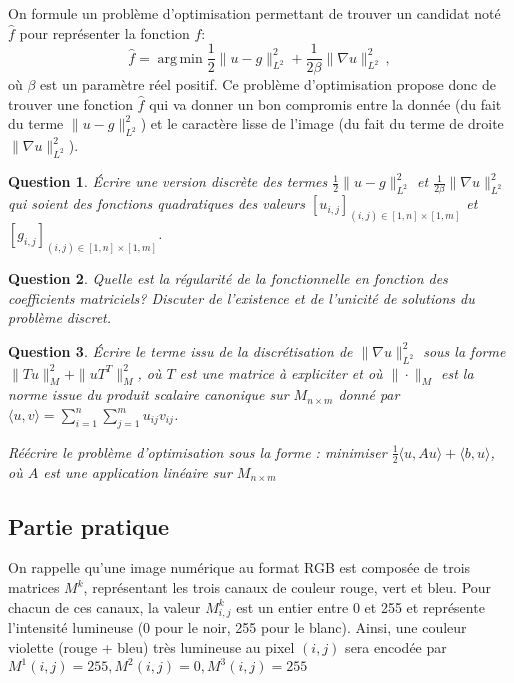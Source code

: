 \documentclass[10pt,a4paper,fleqn]{report}
\DeclareMathOperator*{\argmin}{arg\,min}
\newtheorem{question}{Question}
\begin{document}
On formule un probl\`eme d'optimisation permettant de trouver un
candidat not\'e $\hat{f}$ pour repr\'esenter la fonction $f$:
\begin{equation}
\hat{f} = \argmin \frac12 \| u -  g\|_{L^2}^2 + \frac{1}{2\beta}\| \nabla u \|^2_{L^2}\,,
\end{equation}
o\`u $\beta$ est un param\`etre r\'eel positif.  Ce probl\`eme
d'optimisation propose donc de trouver une fonction $\hat{f}$ qui va
donner un bon compromis entre la donn\'ee (du fait du terme $ \| u -
g\|_{L^2}^2 $) et le caractère lisse de l'image (du fait du terme de
droite $\| \nabla u \|^2_{L^2}$).

\begin{question}
\'Ecrire une version discr\`ete des termes $\frac12 \| u -  g\|_{L^2}^2$ et $\frac{1}{2\beta}\| \nabla u \|^2_{L^2}$ qui soient des fonctions quadratiques des valeurs $[u_{i,j}]_{(i,j)\in [1,n]\times[1,m]}$ et $[g_{i,j}]_{(i,j)\in [1,n]\times[1,m]}$.
\end{question}

\begin{question}
Quelle est la r\'egularit\'e de la fonctionnelle en fonction des coefficients matriciels?
Discuter de l'existence et de l'unicit\'e de solutions du probl\`eme discret.
\end{question}

\begin{question}
  Écrire le terme issu de la discrétisation de $\| \nabla u
  \|^2_{L^2}$ sous la forme $\|Tu\|^{2}_{M} + \|u T^{T}\|^{2}_{M}$, où
  $T$ est une matrice à expliciter et où $\|\cdot\|_{M}$ est la norme
  issue du produit scalaire canonique sur $M_{n \times m}$ donné par
  $\langle u,v \rangle = \sum_{i=1}^{n}\sum_{j=1}^{m} u_{ij} v_{ij}$.
  
  Réécrire le problème d'optimisation sous la forme : minimiser $\frac
  1 2 \langle u, Au\rangle + \langle b, u\rangle$, où $A$ est une
  application linéaire sur $M_{n\times m}$
\end{question}

\subsection{Partie pratique}

On rappelle qu'une image numérique au format RGB est composée de trois
matrices $M^{k}$, représentant les trois canaux de couleur rouge, vert
et bleu. Pour chacun de ces canaux, la valeur $M^{k}_{i,j}$ est un
entier entre 0 et 255 et représente l'intensité lumineuse (0 pour le
noir, 255 pour le blanc). Ainsi, une couleur violette (rouge + bleu)
très lumineuse au pixel $(i,j)$ sera encodée par $M^{1}(i,j) = 255,
M^{2}(i,j) = 0, M^{3}(i,j) = 255$
\end{document}
